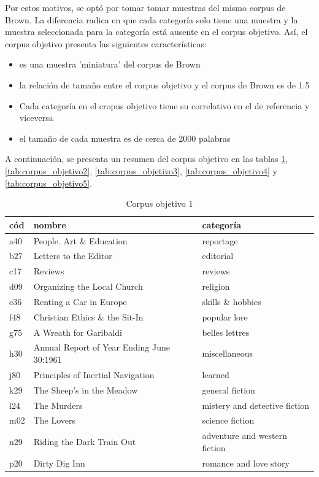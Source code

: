 \documentclass[12pt,letterpaper,twoside]{article}
\begin{document}
Por estos motivos, se optó por tomar tomar muestras del mismo corpus de Brown.
La diferencia radica en que cada categoría solo tiene una muestra y la muestra
seleccionada para la categoría está ausente en el corpus objetivo. Así,
el corpus objetivo presenta las siguientes características:

\begin{itemize}
\item es una muestra 'miniatura' del corpus de Brown
\item la relación de tamaño entre el corpus objetivo y el corpus de Brown es de 1:5
\item Cada categoría en el cropus objetivo tiene su correlativo en el de referencia y viceversa
\item el tamaño de cada muestra es de cerca de 2000 palabras
\end{itemize}

A continuación, se presenta un resumen del corpus objetivo en las
tablas \ref{tab:corpus_objetivo1},
\ref{tab:corpus_objetivo2}, \ref{tab:corpus_objetivo3},
\ref{tab:corpus_objetivo4} y \ref{tab:corpus_objetivo5}.



   \begin{table}[!ht]
    \centering

    \begin{tabular}{|l|l|l|}
    \hline
	cód & nombre & categoría \\ \hline
      a40 & People. Art \& Education & reportage \\ \hline
      b27 & Letters to the Editor & editorial \\ \hline
      c17 & Reviews & reviews \\ \hline
      d09 & Organizing the Local Church & religion \\ \hline
      e36 & Renting a Car in Europe & skills \& hobbies \\ \hline
      f48 & Christian Ethics \& the Sit-In & popular lore \\ \hline
      g75 & A Wreath for Garibaldi & belles lettres \\ \hline
      h30 & Annual Report of Year Ending June 30:1961 & miscellaneous \\ \hline
      j80 & Principles of Inertial Navigation & learned \\ \hline
      k29 & The Sheep's in the Meadow & general fiction \\ \hline
      l24 & The Murders & mistery and detective fiction \\ \hline
      m02 & The Lovers & science fiction \\ \hline
      n29 & Riding the Dark Train Out & adventure and western fiction \\ \hline
      p20 & Dirty Dig Inn & romance and love story \\ \hline
    \end{tabular}
\caption{Corpus objetivo 1}
\label{tab:corpus_objetivo1}
\end{table}
\end{document}
